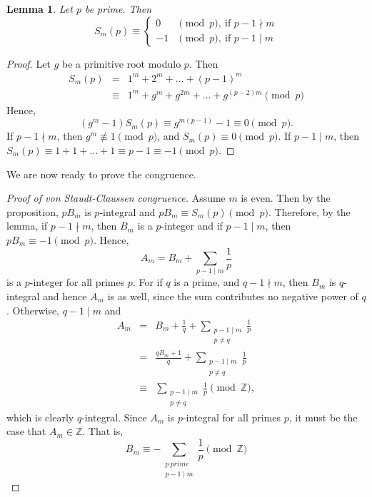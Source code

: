\documentclass[12pt]{article}
\newtheorem{proof}{Proof}
\newtheorem{lemma}{Lemma}
\begin{document}
\begin{lemma}
Let $p$ be prime. Then
$$
S_m(p) \equiv \begin{cases}
0 &\pmod{p}, ~\mbox{if $p-1 \nmid m$} \\
-1 &\pmod{p}, ~\mbox{if $p-1 \mid m$}
\end{cases}
$$
\end{lemma}
\begin{proof}
Let $g$ be a primitive root modulo $p$. Then
\begin{eqnarray*}
S_m(p) &=& 1^m + 2^m + \ldots + (p-1)^m \\
&\equiv& 1^m + g^m + g^{2m} + \ldots + g^{(p-2)m} \pmod{p}
\end{eqnarray*}
Hence,
$$
(g^m - 1) S_m(p) \equiv g^{m(p-1)} - 1 \equiv 0 \pmod{p}.
$$
If $p-1 \nmid m$, then $g^m \not\equiv 1 \pmod{p}$, and $S_m(p) \equiv 0 \pmod{p}$. 
If $p-1 \mid m$, then $S_m(p) \equiv 1 + 1 + \ldots + 1 \equiv p-1 \equiv -1 \pmod{p}$.
\end{proof}

We are now ready to prove the congruence.

\begin{proof}[Proof of von Staudt-Claussen congruence]
Assume $m$ is even. Then by the proposition, $p B_m$ is $p$-integral and $p B_m \equiv S_m(p) \pmod{p}$. Therefore, by the lemma, if $p-1 \nmid m$, then $B_m$ is a $p$-integer and if $p-1 \mid m$, then $p B_m \equiv -1 \pmod{p}$. Hence,
$$
A_m = B_m + \sum_{p-1 \mid m} \frac{1}{p}
$$
is a $p$-integer for all primes $p$. For if $q$ is a prime, and $q-1 \nmid m$, then $B_m$ is $q$-integral and hence $A_m$ is as well, since the sum contributes no negative power of $q$. Otherwise, $q-1 \mid m$ and 
\begin{eqnarray*}
A_m &=& B_m + \frac{1}{q} + \sum_{\substack{p-1 \mid m \\ p \neq q}} \frac{1}{p} \\
&=& \frac{q B_m + 1}{q} + \sum_{\substack{p-1 \mid m \\ p \neq q}} \frac{1}{p} \\
&\equiv& \sum_{\substack{p-1 \mid m \\ p \neq q}} \frac{1}{p} \pmod{\mathbb{Z}},
\end{eqnarray*}
which is clearly $q$-integral. Since $A_m$ is $p$-integral for all primes $p$, it must be the case that $A_m \in \mathbb{Z}$. That is,
$$
B_m \equiv -\sum_{\substack{p ~prime\\ p-1 \mid m}} \frac{1}{p} \pmod{\mathbb{Z}}
$$
\end{proof}
\end{document}
